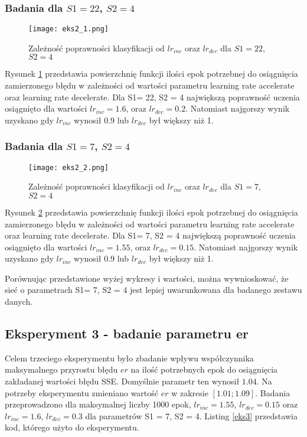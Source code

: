 \documentclass[12pt,twoside]{article}
\begin{document}
\subsubsection{Badania dla $S1=22$, $S2=4$}

\begin{figure}[H]
\centering
\texttt{[image: eks2\_1.png]}
\caption{Zależność poprawności klasyfikacji od $lr_{inc}$ oraz $lr_{dec}$ dla $S1=22$, $S2=4$}
\label{eks2_1}
\end{figure}


Rysunek \ref{eks2_1} przedstawia powierzchnię funkcji ilości epok potrzebnej do osiągnięcia zamierzonego błędu w zależności od wartości parametru learning rate accelerate oraz learning rate decelerate. Dla S1= 22, S2 = 4 największą poprawność uczenia osiągnięto dla wartości $lr_{inc}  =  1.6$, oraz $lr_{dec} = 0.2$. Natomiast najgorszy wynik uzyskano gdy $lr_{inc}$ wynosił 0.9 lub $lr_{dec}$ był większy niż 1.

\subsubsection{Badania dla $S1=7$, $S2=4$}

\begin{figure}[H]
\centering
\texttt{[image: eks2\_2.png]}
\caption{Zależność poprawności klasyfikacji od $lr_{inc}$ oraz $lr_{dec}$ dla $S1=7$, $S2=4$}
\label{eks2_2}
\end{figure}

Rysunek \ref{eks2_2} przedstawia powierzchnię funkcji ilości epok potrzebnej do osiągnięcia zamierzonego błędu w zależności od wartości parametru learning rate accelerate oraz learning rate decelerate. Dla S1= 7, S2 = 4 największą poprawność uczenia osiągnięto dla wartości $lr_{inc}  =  1.55$, oraz $lr_{dec} = 0.15$. Natomiast najgorszy wynik uzyskano gdy $lr_{inc}$ wynosił 0.9 lub $lr_{dec}$ był większy niż 1.

Porównując przedstawione wyżej wykresy i wartości, można wywnioskować, że sieć o parametrach S1= 7, S2 = 4 jest lepiej uwarunkowana dla badanego zestawu danych. 


\subsection{Eksperyment 3 - badanie parametru er}
Celem trzeciego eksperymentu było zbadanie wpływu współczynnika maksymalnego przyrostu błędu $er$ na ilość potrzebnych epok do osiągnięcia zakładanej wartości błędu SSE. Domyślnie parametr ten wynosił $1.04$. Na potrzeby eksperymentu zmieniano wartość $er$ w zakresie $[1.01; 1.09]$. Badania przeprowadzono dla maksymalnej liczby 1000 epok, $lr_{inc}  = 1.55$, $lr_{dec} = 0.15$ oraz $lr_{inc}  = 1.6$, $lr_{dec} = 0.3$ dla parametrów S1 = 7, S2 = 4. Listing \ref{eks3} przedstawia kod, którego użyto do eksperymentu.
\end{document}
